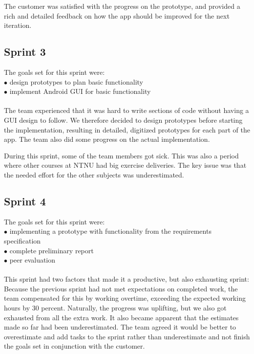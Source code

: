 The customer was satisfied with the progress on the prototype, and provided a rich and detailed feedback on how the app should be improved for the next iteration.

\subsection{Sprint 3}
The goals set for this sprint were:\\
$\bullet$\hspace{0.25cm} design prototypes to plan basic functionality\\
$\bullet$\hspace{0.25cm} implement Android GUI for basic functionality\\\\
The team experienced that it was hard to write sections of code without having a GUI design to follow. We therefore decided to design prototypes before starting the implementation, resulting in detailed, digitized prototypes for each part of the app. The team also did some progress on the actual implementation.

During this sprint, some of the team members got sick. This was also a period where other courses at NTNU had big exercise deliveries. The key issue was that the needed effort for the other subjects was underestimated. 

\subsection{Sprint 4}
The goals set for this sprint were:\\
$\bullet$\hspace{0.25cm} implementing a prototype with functionality from the requirements specification\\
$\bullet$\hspace{0.25cm} complete preliminary report\\
$\bullet$\hspace{0.25cm} peer evaluation\\\\
This sprint had two factors that made it a productive, but also exhausting sprint: Because the previous sprint had not met expectations on completed work, the team compensated for this by working overtime, exceeding the expected working hours by 30 percent. Naturally, the progress was uplifting, but we also got exhausted from all the extra work. It also became apparent that the estimates made so far had been underestimated. The team agreed it would be better to overestimate and add tasks to the sprint rather than underestimate and not finish the goals set in conjunction with the customer.


